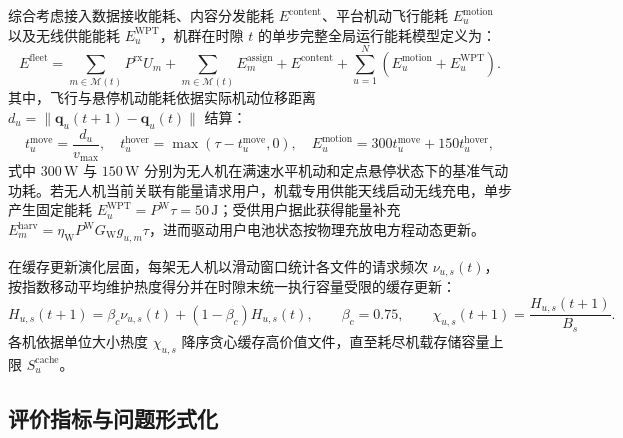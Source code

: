 综合考虑接入数据接收能耗、内容分发能耗 $E^{\mathrm{content}}$、平台机动飞行能耗 $E_u^{\mathrm{motion}}$ 以及无线供能能耗 $E_u^{\mathrm{WPT}}$，机群在时隙 $t$ 的单步完整全局运行能耗模型定义为：
\begin{equation}
    E^{\mathrm{fleet}} = 
    \sum_{m\in\mathcal M(t)} P^{\mathrm{rx}} U_m + 
    \sum_{m\in\mathcal M(t)} E_m^{\mathrm{assign}} + 
    E^{\mathrm{content}} + 
    \sum_{u=1}^N \left(E_u^{\mathrm{motion}} + E_u^{\mathrm{WPT}}\right).
    \label{eq:ch3-full-fleet-energy}
\end{equation}
其中，飞行与悬停机动能耗依据实际机动位移距离 $d_u = \|\mathbf q_u(t+1) - \mathbf q_u(t)\|$ 结算：
\begin{equation}
    t_u^{\mathrm{move}} = \frac{d_u}{v_{\max}}, \quad 
    t_u^{\mathrm{hover}} = \max(\tau - t_u^{\mathrm{move}}, 0), \quad 
    E_u^{\mathrm{motion}} = 300 t_u^{\mathrm{move}} + 150 t_u^{\mathrm{hover}},
    \label{eq:ch3-motion-energy}
\end{equation}
式中 $300\,\mathrm{W}$ 与 $150\,\mathrm{W}$ 分别为无人机在满速水平机动和定点悬停状态下的基准气动功耗。若无人机当前关联有能量请求用户，机载专用供能天线启动无线充电，单步产生固定能耗 $E_u^{\mathrm{WPT}} = P^{\mathrm W}\tau = 50\,\mathrm{J}$；受供用户据此获得能量补充 $E_m^{\mathrm{harv}} = \eta_{\mathrm W} P^{\mathrm W} G_{\mathrm W} g_{u,m} \tau$，进而驱动用户电池状态按物理充放电方程动态更新。

在缓存更新演化层面，每架无人机以滑动窗口统计各文件的请求频次 $\nu_{u,s}(t)$，按指数移动平均维护热度得分并在时隙末统一执行容量受限的缓存更新：
\begin{equation}
    H_{u,s}(t+1) = \beta_c \nu_{u,s}(t) + (1 - \beta_c) H_{u,s}(t), \qquad \beta_c=0.75, \qquad \chi_{u,s}(t+1) = \frac{H_{u,s}(t+1)}{B_s}.
    \label{eq:ch3-cache-score}
\end{equation}
各机依据单位大小热度 $\chi_{u,s}$ 降序贪心缓存高价值文件，直至耗尽机载存储容量上限 $S_u^{\mathrm{cache}}$。

\subsection{评价指标与问题形式化}
\label{sec:dsr-decomposition}
\label{sec:fairness-model}

